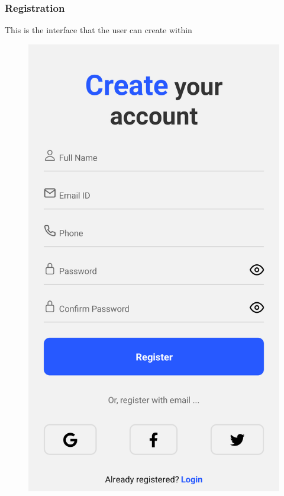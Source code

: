 \subsubsection{Registration}
This is the interface that the user can create within 
\begin{figure}[H]
\begin{minipage}{0.45\textwidth}
    \centering
    \includegraphics[width=\linewidth]{images/chap2/RegisterForm.png}
    \label{fig:login-form}
\end{minipage}\hfill

\end{figure}
